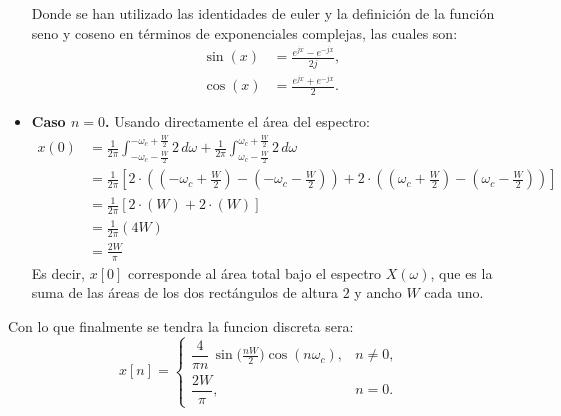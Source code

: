 \documentclass[
  11pt,
  letterpaper,
   addpoints,
   answers
  ]{exam}
\begin{document}
\begin{questions}
\begin{solution}
\begin{itemize}
Donde se han utilizado las identidades de euler y la definición de la función seno y coseno en términos de exponenciales complejas, las cuales son:
\begin{align}
\sin(x)&=\frac{e^{jx}-e^{-jx}}{2j},\\
\cos(x)&=\frac{e^{jx}+e^{-jx}}{2}.
\end{align}
\item \textbf{Caso $n=0$.} Usando directamente el área del espectro:
\[
\begin{aligned}
  x(0) &= \frac{1}{2\pi} \int_{-\omega_c-\frac{W}{2}}^{-\omega_c+\frac{W}{2}} 2\,d\omega
         + \frac{1}{2\pi} \int_{\omega_c-\frac{W}{2}}^{\omega_c+\frac{W}{2}} 2\,d\omega \\
       &= \frac{1}{2\pi} \left[ 2 \cdot \left( \left(-\omega_c+\frac{W}{2}\right) - \left(-\omega_c-\frac{W}{2}\right) \right)
         + 2 \cdot \left( \left(\omega_c+\frac{W}{2}\right) - \left(\omega_c-\frac{W}{2}\right) \right) \right] \\
       &= \frac{1}{2\pi} \left[ 2 \cdot (W) + 2 \cdot (W) \right] \\
       &= \frac{1}{2\pi} (4W) \\
       &= \frac{2W}{\pi}
\end{aligned}
\]
Es decir, $x[0]$ corresponde al área total bajo el espectro $X(\omega)$, que es la suma de las áreas de los dos rectángulos de altura $2$ y ancho $W$ cada uno.
\end{itemize}
Con lo que finalmente se tendra la funcion discreta sera:
\[
x[n]=
\begin{cases}
\dfrac{4}{\pi n}\,\sin\!\big(\frac{nW}{2}\big)\cos(n\omega_c), & n\neq 0,\\[2mm]
\dfrac{2W}{\pi}, & n=0.
\end{cases}
\]
\begin{figure}[H]
\centering
{}
\end{figure}
\end{solution}
\end{questions}
\end{document}
